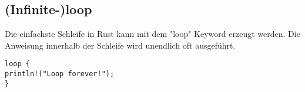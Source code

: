 \subsection{(Infinite-)loop}
Die einfachste Schleife in Rust kann mit dem "loop" Keyword erzeugt werden. Die Anweisung innerhalb der Schleife wird unendlich oft ausgeführt.

\begin{lstlisting}
loop {
println!("Loop forever!");
}
\end{lstlisting}